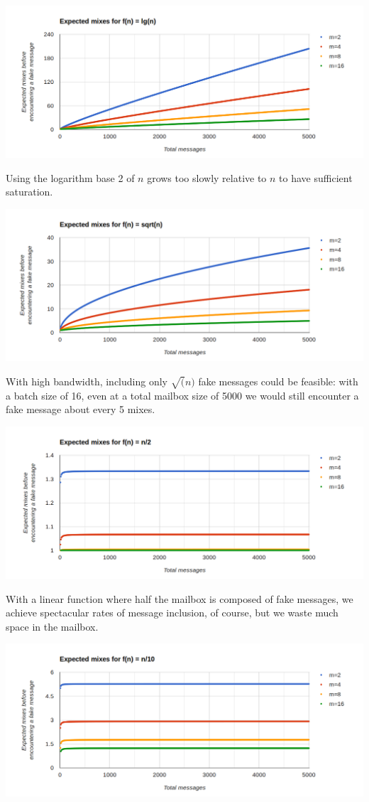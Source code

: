 \documentclass[pageno]{jpaper}
\begin{document}
\includegraphics[width=\textwidth]{lgn}

Using the logarithm base 2 of $n$ grows too slowly relative to $n$ to have sufficient saturation.

\includegraphics[width=\textwidth]{sqrtn}

With high bandwidth, including only $\sqrt(n)$ fake messages could be feasible: with a batch size of 16, even at a total mailbox size of 5000 we would still encounter a fake message about every 5 mixes.


\includegraphics[width=\textwidth]{nover2}

With a linear function where half the mailbox is composed of fake messages, we achieve spectacular rates of message inclusion, of course, but we waste much space in the mailbox.

\includegraphics[width=\textwidth]{nover10}
\end{document}
